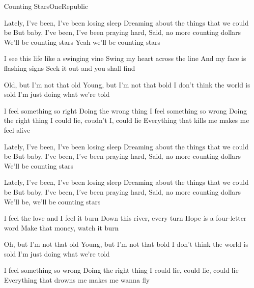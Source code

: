 \documentclass[a4paper,11pt,french]{article}
\begin{document}
\begin{Song}{Counting Stars}{OneRepublic}
\begin{multicols}{2}

\begin{Chorus}
Lately, I've been, I've been losing sleep
Dreaming about the things that we could be
But baby, I've been, I've been praying hard,
Said, no more counting dollars
We'll be counting stars
Yeah we'll be counting stars
\end{Chorus}
\espaceInterStrophe

\begin{Verse}
I see this life like a swinging vine
Swing my heart across the line
And my face is flashing signs
Seek it out and you shall find
\espaceInterStrophe

Old, but I'm not that old
Young, but I'm not that bold
I don't think the world is sold
I'm just doing what we're told
\end{Verse}
\espaceInterStrophe

\begin{PreChorus}
I feel something so right
Doing the wrong thing
I feel something so wrong
Doing the right thing
I could lie, coudn't I, could lie
Everything that kills me makes me feel alive
\end{PreChorus}
\espaceInterStrophe

\begin{Chorus}
Lately, I've been, I've been losing sleep
Dreaming about the things that we could be
But baby, I've been, I've been praying hard,
Said, no more counting dollars
We'll be counting stars
\espaceInterStrophe

Lately, I've been, I've been losing sleep
Dreaming about the things that we could be
But baby, I've been, I've been praying hard,
Said, no more counting dollars
We'll be, we'll be counting stars
\end{Chorus}
\columnbreak

\begin{Verse}
I feel the love and I feel it burn
Down this river, every turn
Hope is a four-letter word
Make that money, watch it burn
\espaceInterStrophe

Oh, but I'm not that old
Young, but I'm not that bold
I don't think the world is sold
I'm just doing what we're told
\end{Verse}
\espaceInterStrophe

\begin{PreChorus}
I feel something so wrong
Doing the right thing
I could lie, could lie, could lie
Everything that drowns me makes me wanna fly
\end{PreChorus}
\espaceInterStrophe


\end{multicols}
\end{Song}
\end{document}
